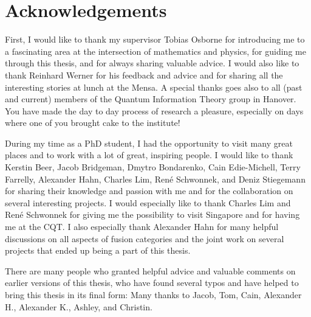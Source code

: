 \chapter*{Acknowledgements}




First, I would like to thank my supervisor Tobias Osborne for introducing me to a fascinating area at the intersection of mathematics and physics, for guiding me through this thesis, and for always sharing valuable advice. I would also like to thank Reinhard Werner for his feedback and advice and for sharing all the interesting stories at lunch at the Mensa. A special thanks goes also to all (past and current) members of the Quantum Information Theory group in Hanover. You have made the day to day process of research a pleasure, especially on days where one of you brought cake to the institute!


During my time as a PhD student, I had the opportunity to visit many great places and to work with a lot of great, inspiring people. I would like to thank Kerstin Beer, Jacob Bridgeman, Dmytro Bondarenko, Cain Edie-Michell, Terry Farrelly, Alexander Hahn, Charles Lim, René Schwonnek, and Deniz Stiegemann for sharing their knowledge and passion with me and for the collaboration on several interesting projects. I would especially like to thank Charles Lim and René Schwonnek for giving me the possibility to visit Singapore and for having me at the CQT. I also especially thank Alexander Hahn for many helpful discussions on all aspects of fusion categories and the joint work on several projects that ended up being a part of this thesis.


There are many people who granted helpful advice and valuable comments on earlier versions of this thesis, who have found several typos and have helped to bring this thesis in its final form: Many thanks to Jacob, Tom, Cain, Alexander H., Alexander K., Ashley, and Christin.


%

